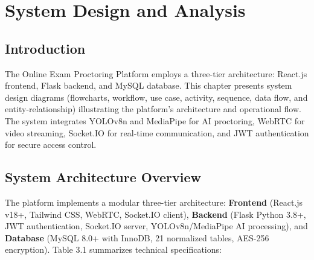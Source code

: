 \chapter{System Design and Analysis}

\section{Introduction}

The Online Exam Proctoring Platform employs a three-tier architecture: React.js frontend, Flask backend, and MySQL database. This chapter presents system design diagrams (flowcharts, workflow, use case, activity, sequence, data flow, and entity-relationship) illustrating the platform's architecture and operational flow. The system integrates YOLOv8n and MediaPipe for AI proctoring, WebRTC for video streaming, Socket.IO for real-time communication, and JWT authentication for secure access control.

\section{System Architecture Overview}

The platform implements a modular three-tier architecture: \textbf{Frontend} (React.js v18+, Tailwind CSS, WebRTC, Socket.IO client), \textbf{Backend} (Flask Python 3.8+, JWT authentication, Socket.IO server, YOLOv8n/MediaPipe AI processing), and \textbf{Database} (MySQL 8.0+ with InnoDB, 21 normalized tables, AES-256 encryption). Table 3.1 summarizes technical specifications:

